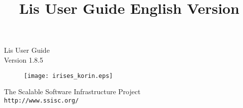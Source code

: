 \documentclass[a4paper]{article}
\title{Lis User Guide English Version}
\author{}
\date{}
\begin{document}
\vspace*{4cm}
\begin{flushleft}
{\Large Lis User Guide}\\
Version 1.8.5
\end{flushleft}

\vspace*{2cm}
\begin{figure}[h]
\texttt{[image: irises\_korin.eps]}
\end{figure}

\vspace*{2cm}
\begin{flushleft}
{\large The Scalable Software Infrastructure
Project\\
{\tt http://www.ssisc.org/}}\\
\end{flushleft}

\vspace*{5mm}
\thispagestyle{empty}
\end{document}
